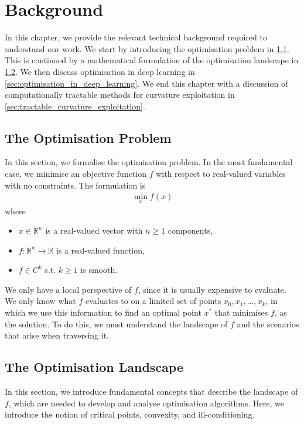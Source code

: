\chapter{Background}
\label{chap:background}

In this chapter, we provide the relevant technical background required to understand our work. We start by introducing the optimisation problem in \cref{sec:optimisation_problem}. This is continued by a mathematical formulation of the optimisation landscape in \cref{sec:optimisation_landscape}. We then discuss optimisation in deep learning in \cref{sec:optimisation_in_deep_learning}. We end this chapter with a discussion of computationally tractable methods for curvature exploitation in \cref{sec:tractable_curvature_exploitation}.

\section{The Optimisation Problem}
\label{sec:optimisation_problem}

In this section, we formalise the optimisation problem. In the most fundamental case, we minimise an objective function $f$ with respect to real-valued variables with no constraints. The formulation is 
\begin{align}
    \min_{x} f(x)
\end{align}
where
\begin{itemize}
    \item $x \in \mathbb{R}^n$ is a real-valued vector with $n \geq 1$ components,
    \item $f: \mathbb{R}^n \to \mathbb{R}$ is a real-valued function,
    \item $f \in C^k$ s.t. $k \geq 1$ is smooth.
\end{itemize}
We only have a local perspective of $f$, since it is usually expensive to evaluate. We only know what $f$ evaluates to on a limited set of points $x_0, x_1, \ldots, x_k$, in which we use this information to find an optimal point $x^*$ that minimises $f$, as the solution. To do this, we must understand the landscape of $f$ and the scenarios that arise when traversing it.

\section{The Optimisation Landscape}
\label{sec:optimisation_landscape}
In this section, we introduce fundamental concepts that describe the landscape of $f$, which are needed to develop and analyse optimisation algorithms. Here, we introduce the notion of critical points, convexity, and ill-conditioning.


